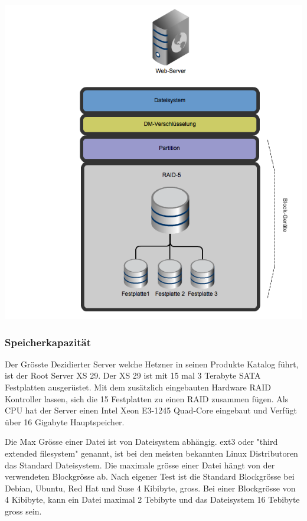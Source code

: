 \begin{center}
\includegraphics[width=\linewidth, keepaspectratio = true]{media/HetznerRAID.png}
\end{center}

\subsubsection*{Speicherkapazität}
Der Grösste Dezidierter Server welche Hetzner in seinen Produkte Katalog führt, ist der Root Server XS 29. Der XS 29 ist mit 15 mal 3 Terabyte SATA Festplatten ausgerüstet. Mit dem zusätzlich eingebauten Hardware RAID Kontroller lassen, sich die 15 Festplatten zu einen RAID zusammen fügen.
Als CPU hat der Server einen Intel Xeon E3-1245 Quad-Core eingebaut und Verfügt über 16 Gigabyte Hauptspeicher. 

Die Max Grösse einer Datei ist von Dateisystem abhängig. ext3 oder "third extended filesystem" genannt, ist bei den meisten bekannten Linux Distributoren das Standard Dateisystem. Die maximale grösse einer Datei hängt von der verwendeten Blockgrösse ab. Nach eigener Test ist die Standard Blockgrösse bei Debian, Ubuntu, Red Hat und Suse 4 Kibibyte, gross. Bei einer Blockgrösse von 4 Kibibyte, kann ein Datei maximal 2 Tebibyte und das Dateisystem 16 Tebibyte gross sein. \cite{Card1993}

